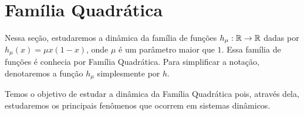 \section{Família Quadrática}

Nessa seção, estudaremos a dinâmica da família de funções $h_\mu: \mathbb{R} \to \mathbb{R}$ dadas por $h_\mu(x) = \mu x(1-x)$, onde $\mu$ é um parâmetro maior que $1$.
Essa família de funções é conhecia por Família Quadrática.
Para simplificar a notação, denotaremos a função $h_\mu$ simplesmente por $h$. 

Temos o objetivo de estudar a dinâmica da Família Quadrática pois, através dela,  estudaremos os principais fenômenos que ocorrem em sistemas dinâmicos.